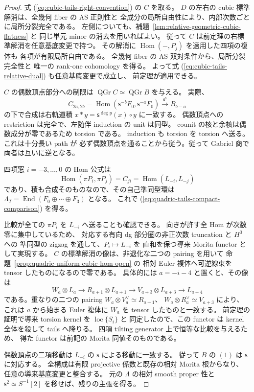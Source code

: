 \begin{proof}
式 (\ref{eq:cubic-tails-right-convention}) の $C$ を取る。
$D$ の左右の cubic 標準解消は、全幾何 fiber の AS 正則性と
全成分の局所自由性により、内部次数ごとに局所分裂完全である。
左側についても、補題~\ref{lem:relative-geometric-cubic-flatness} と
同じ単元 minor の消去を用いればよい。
従って $C$ は前定理の右標準解消を任意基底変更で持つ。
その解消に $\operatorname{Hom}(-,P_j)$ を適用した四項の複体も
各項が有限局所自由である。
全幾何 fiber の AS 双対条件から、局所分裂完全性と
唯一の rank-one cohomology を得る。
よって式 (\ref{eq:cubic-tails-relative-dual}) も任意基底変更で成立し、
前定理が適用できる。

$C$ の偶数頂点部分への制限は
$\operatorname{QGr}C\simeq\operatorname{QGr}B$ を与える。
実際、
\[
 C_{2a,2b}=\operatorname{Hom}(\mathsf s^{-b}F_0,\mathsf s^{-a}F_0)
 \xrightarrow{\ \mathsf s^b\ } B_{b-a}
\]
の下で合成は右軌道積
$x*y=\mathsf s^{\deg y}(x)\circ y$ に一致する。
偶数頂点への restriction は完全で、左随伴 induction の unit は同型。
counit の核と余核は偶数成分が零であるため torsion である。
induction も torsion を torsion へ送る。これは十分長い path が
必ず偶数頂点を通ることから従う。従って Gabriel 商で両者は互いに逆となる。

四項窓 $i=-3,\ldots,0$ の Hom 公式は
\[
 \operatorname{Hom}(\pi P_i,\pi P_j)
     =C_{ji}=\operatorname{Hom}(L_{-i},L_{-j})
\]
であり、積も合成そのものなので、その自己準同型環は
$\Lambda_T=\operatorname{End}(F_0\oplus\cdots\oplus F_3)$ となる。
これで (\ref{eq:quadric-tails-compact-comparison}) を得る。

比較が全ての $\pi P_i$ を $L_{-i}$ へ送ることも確認できる。
向きが許す全 Hom が次数零に集中しているため、
対応する有向 dg 部分圏の非正次数 truncation と $H^0$ への
準同型の zigzag を通して、$P_i\mapsto L_{-i}$ を
直和を保つ導来 Morita functor として実現する。
$C$ の標準解消の像は、非退化な二つの pairing を用いて
命題~\ref{prop:quadric-uniform-cubic-hom-open} の
相対 Euler 複体へ可逆線束を tensor したものになるので零である。
具体的には $a=-i-4$ と置くと、その像は
\[
 W_a\otimes L_a\longrightarrow R_{a+1}\otimes L_{a+1}
 \longrightarrow V_{a+3}\otimes L_{a+3}\longrightarrow L_{a+4}
\]
である。重なりの二つの pairing
$W_a\otimes V_a^\vee\simeq R_{a+1}$、
$W_a\otimes R_a^\vee\simeq V_{a+3}$ により、
これは $a$ から始まる Euler 複体に $W_a$ を tensor したものと一致する。
前定理の証明で導来 torsion kernel を $\operatorname{loc}\{S_i\}$ と
同定したので、この functor は kernel 全体を殺して tails へ降りる。
四項 tilting generator 上で恒等な比較を与えるため、
得た functor は前記の Morita 同値そのものである。

偶数頂点の二項移動は $L_{-i}$ の $\mathsf s$ による移動に一致する。
従って $B$ の $(1)$ は $\mathsf s$ に対応する。
全構成は有限 projective 係数と既存の相対 Morita 根からなり、
任意の導来基底変更と整合する。
元の $\Lambda$ の相対 smooth proper 性と
$\mathsf s^2\simeq S^{-1}[2]$ を移せば、残りの主張を得る。
\end{proof}


